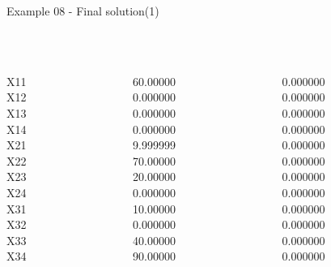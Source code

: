 \begin{frame}{Example 08 - Final solution(1)}
\footnotesize
{} \\
  \\

\begin{columns}[t]
\begin{column}{0.3\textwidth}
\\
X11\\
X12\\
X13\\
X14\\
X21\\
X22\\
X23\\
X24\\
X31\\
X32\\
X33\\
X34\\

\end{column}
\begin{column}{0.3\textwidth}
\\
60.00000\\
0.000000\\
0.000000\\
0.000000\\
9.999999\\
70.00000\\
20.00000\\
0.000000\\
10.00000\\
0.000000\\
40.00000\\
90.00000\\
\end{column}  

\begin{column}{0.3\textwidth}
\\
0.000000\\
0.000000\\
0.000000\\
0.000000\\
0.000000\\
0.000000\\
0.000000\\
0.000000\\
0.000000\\
0.000000\\
0.000000\\
0.000000\\

\end{column}
\end{columns}  

\end{frame}


